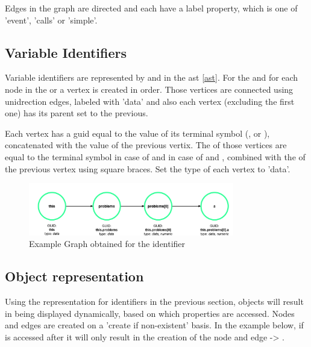 Edges in the graph are directed and each have a label property, which is one of 'event', 'calls' or 'simple'. 

\subsection{Variable Identifiers}
\label{concept:variable_identifiers}
Variable identifiers are represented by  and  in the \gls{ast} \ref{ast}. For the  and for each  node in the  or  a vertex is created in order. 
Those vertices are connected using unidrection edges, labeled with 'data' and also each vertex (excluding the first one) has its parent set to the previous.

Each vertex has a \gls{guid} equal to the value of its terminal symbol (,  or ), concatenated with the value of the previous vertix.
The  of those vertices are equal to the terminal symbol in case of  and in case of  and , combined with the  of the previous vertex using square braces.  Set the type of each vertex to 'data'.

\begin{figure}[H]
    \includegraphics[width=0.8\textwidth]{images/graph_simple.png}
     \caption{Example Graph obtained for the identifier  }
     \label{fig:graph_simple}
\end{figure}

\subsection{Object representation}

Using the representation for identifiers in the previous section, objects will result in being displayed dynamically, based on which properties are accessed. Nodes and edges are created on a 'create if non-existent' basis. In the example below, if  is accessed after  it will only result in the creation of the node  and edge  -> .

